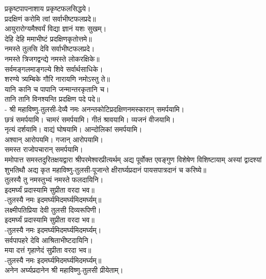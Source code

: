प्रकृष्टपापनाशाय प्रकृष्टफलसिद्धये।\\
प्रदक्षिणं करोमि त्वां सर्वाभीष्टफलप्रदे॥\\

आयुरारोग्यमैश्वर्यं विद्या ज्ञानं यशः सुखम्।\\
देहि देहि ममाभीष्टं प्रदक्षिणकृतोत्तमे॥\\

नमस्ते तुलसि देवि सर्वाभीष्टफलप्रदे।\\
नमस्ते त्रिजगद्वन्द्ये नमस्ते लोकरक्षिके॥\\

सर्वमङ्गलमाङ्गल्ये शिवे सर्वार्थसाधिके।\\
शरण्ये त्र्यम्बिके गौरि नारायणि नमोऽस्तु ते॥\\

यानि कानि च पापानि जन्मान्तरकृतानि च।\\
तानि तानि विनश्यन्ति प्रदक्षिण पदे पदे॥\\

- श्री महाविष्णु-तुलसी-देव्यै नमः अनन्तकोटिप्रदक्षिणनमस्कारान् समर्पयामि।\\
छत्रं समर्पयामि। चामरं समर्पयामि। गीतं श्रावयामि। व्यजनं वीजयामि।\\
नृत्यं दर्शयामि। वाद्यं घोषयामि। आन्दोलिकां समर्पयामि।\\
अश्वान् आरोपयमि। गजान् आरोपयामि।\\
समस्त राजोपचारान् समर्पयामि।\\


ममोपात्त समस्तदुरितक्षयद्वारा श्रीपरमेश्वरप्रीत्यर्थम् अद्य पूर्वोक्त एवङ्गुण विशेषेण विशिष्टायाम् अस्यां द्वादश्यां शुभतिथौ अद्य कृत महाविष्णु-तुलसी-पूजान्ते क्षीरार्घ्यप्रदानं पायसपात्रदानं च करिष्ये॥\\

तुलस्यै तु नमस्तुभ्यं नमस्ते फलदायिनि।\\
इदमर्घ्यं प्रदास्यामि सुप्रीता वरदा भव॥\\
-तुलस्यै नमः इदमर्घ्यमिदमर्घ्यमिदमर्घ्यम्॥\\
लक्ष्मीपतिप्रिया देवी तुलसी दिव्यरूपिणी।\\
इदमर्घ्यं प्रदास्यामि सुप्रीता वरदा भव॥\\
-तुलस्यै नमः इदमर्घ्यमिदमर्घ्यमिदमर्घ्यम्।\\
सर्वपापहरे देवि आश्रिताभीष्टदायिनि।\\
मया दत्तं गृहाणेदं सुप्रीता वरदा भव॥\\
-तुलस्यै नमः इदमर्घ्यमिदमर्घ्यमिदमर्घ्यम्॥\\
अनेन अर्घ्यप्रदानेन श्री महाविष्णु-तुलसी प्रीयेताम्।\\

